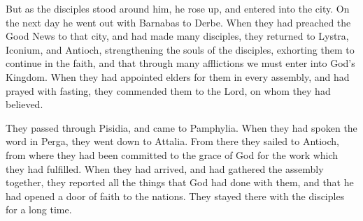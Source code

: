 {\par }{\PP {}But as the disciples stood around him, he rose up, and entered into the city. On the next day he went out with Barnabas to Derbe.
When they had preached the Good News to that city, and had made many disciples, they returned to Lystra, Iconium, and Antioch,
strengthening the souls of the disciples, exhorting them to continue in the faith, and that through many afflictions we must enter into God’s Kingdom.
When they had appointed elders for them in every assembly, and had prayed with fasting, they commended them to the Lord, on whom they had believed.
\par }{\PP {}They passed through Pisidia, and came to Pamphylia.
When they had spoken the word in Perga, they went down to Attalia.
From there they sailed to Antioch, from where they had been committed to the grace of God for the work which they had fulfilled.
When they had arrived, and had gathered the assembly together, they reported all the things that God had done with them, and that he had opened a door of faith to the nations.
They stayed there with the disciples for a long time.

}
